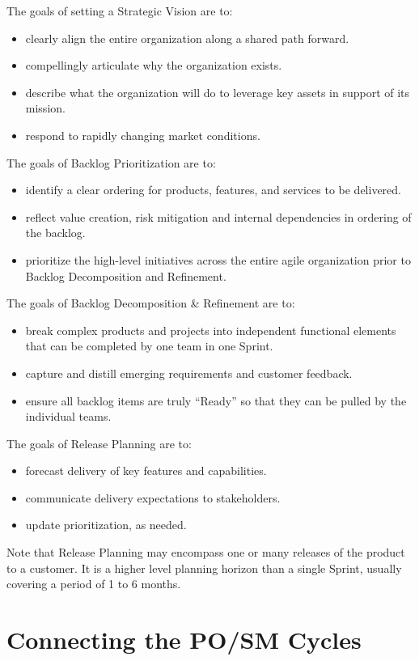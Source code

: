 \documentclass[12pt,a4paper,parskip=full]{scrartcl}
\begin{document}
The goals of setting a Strategic Vision are to:
\begin{itemize}
\item clearly align the entire organization along a shared path forward.
\item compellingly articulate why the organization exists.
\item describe what the organization will do to leverage key assets in
support of its mission.
\item respond to rapidly changing market conditions.
\end{itemize}
The goals of Backlog Prioritization are to:
\begin{itemize}
\item identify a clear ordering for products, features, and services to be
delivered.
\item reflect value creation, risk mitigation and internal dependencies in
ordering of the backlog.
\item prioritize the high-level initiatives across the entire agile
organization prior to Backlog Decomposition and Refinement.
\end{itemize}
The goals of Backlog Decomposition \& Refinement are to:
\begin{itemize}
\item break complex products and projects into independent functional
elements that can be completed by one team in one Sprint.
\item capture and distill emerging requirements and customer feedback.
\item ensure all backlog items are truly ``Ready'' so that they can be
pulled by the individual teams.
\end{itemize}
The goals of Release Planning are to:
\begin{itemize}
\item forecast delivery of key features and capabilities.
\item communicate delivery expectations to stakeholders.
\item update prioritization, as needed.
\end{itemize}

Note that Release Planning may encompass one or many releases of the product to a customer.  
It is a higher level planning horizon than a single Sprint, usually covering a period of 1 to 6 months.

\section{Connecting the PO/SM Cycles}
\end{document}
